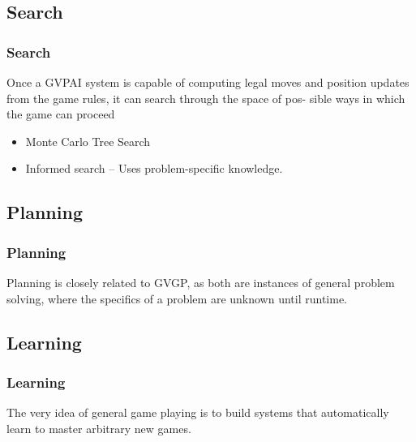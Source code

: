 \documentclass{beamer}
\begin{document}
\subsection{Search}
\begin{frame}
  \frametitle{Search\cite{12}}
  Once a GVPAI system is capable of computing legal moves and position updates from the game rules, it can search through the space of pos- sible ways in which the game can proceed
  \begin{itemize}
    \item Monte Carlo Tree Search
    \item Informed search -- Uses problem-specific knowledge.
  \end{itemize}

\end{frame}

\subsection{Planning}
\begin{frame}
  \frametitle{Planning}
  Planning is closely related to GVGP, as both are instances of general problem solving, where the specifics of a problem are unknown until runtime.
\end{frame}

\subsection{Learning}
\begin{frame}
  \frametitle{Learning}
  The very idea of general game playing is to build systems that automatically learn to master arbitrary new games.
  

\end{frame}

\end{document}
